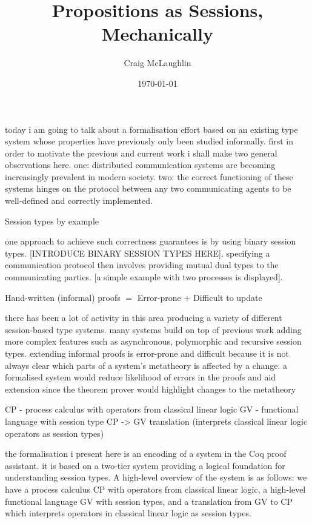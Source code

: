 \documentclass{beamer}
\title[Project Presentation]{Propositions as Sessions, Mechanically}
\author{Craig McLaughlin}
\institute{University Of Glasgow}
\date{\today}
\begin{document}
\begin{frame}
\titlepage
\end{frame}


today i am going to talk about a formalisation effort based on an existing
type system whose properties have previously only been studied
informally. first in order to motivate the previous and current work i shall
make two general observations here. one: distributed communication systems are
becoming increasingly prevalent in modern society. two: the correct
functioning of these systems hinges on the protocol between any two
communicating agents to be well-defined and correctly implemented.

\begin{frame}
Session types by example
\end{frame}

one approach to achieve such correctness guarantees is by using binary session
types. [INTRODUCE BINARY SESSION TYPES HERE]. specifying a communication
protocol then involves providing mutual dual types to the communicating
parties. [a simple example with two processes is displayed].

\begin{frame}
Hand-written (informal) proofs $=$ Error-prone $+$ Difficult to update
\end{frame}

there has been a lot of activity in this area producing a variety of different
session-based type systems. many systems build on top of previous work adding
more complex features such as asynchronous, polymorphic and recursive session
types. extending informal proofs is error-prone and difficult because it is
not always clear which parts of a system's metatheory is affected by a
change. a formalised system would reduce likelihood of errors in the proofs
and aid extension since the theorem prover would highlight changes to the
metatheory

\begin{frame}
CP - process calculus with operators from classical linear logic
GV - functional language with session type
CP -> GV translation (interprets classical linear logic operators as session
types)
\end{frame}

the formalisation i present here is an encoding of a system in the Coq proof
assistant. it is based on a two-tier system providing a logical foundation for
understanding session types. A high-level overview of the system is as
follows: we have a process calculus CP with operators from classical linear
logic, a high-level functional language GV with session types, and a
translation from GV to CP which interprets operators in classical linear logic
as session types.
\end{document}
